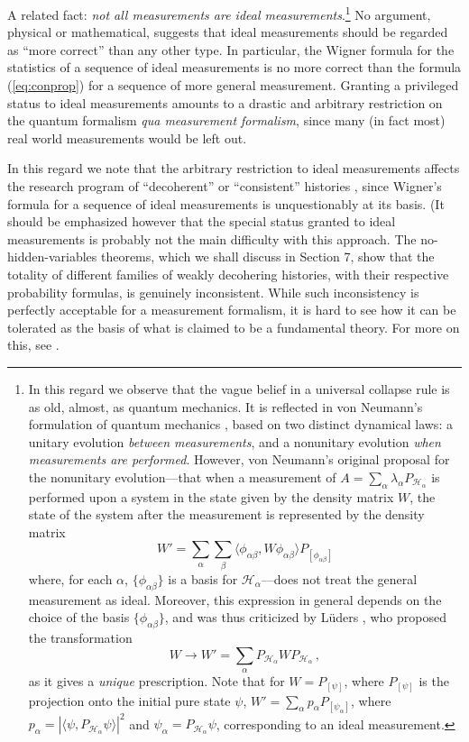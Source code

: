 \documentclass[12pt]{article}
\newcommand{\eq}[1]{(\ref{#1})}
\renewcommand{\a}{\alpha}
\newcommand{\la}{\lambda_{\a}}
\newcommand{\suma}{\sum_{\a }}
\newcommand{\psia}{\psi_{\a}}
\renewcommand{\H}{\mbox{$\mathcal{H}$}}
\newcommand{\Pa}{ P_{ {\mathcal{H}_{\a} } } }
\begin{document}
A related fact: \emph{not all measurements are ideal
   measurements}.\footnote{In this regard we observe that the vague
   belief in a universal collapse rule is as old, almost, as quantum
   mechanics.  It is reflected in von Neumann's formulation of quantum
   mechanics \cite{vNe55}, based on two distinct dynamical laws: a
   unitary evolution {\it between measurements\/}, and a nonunitary
   evolution {\it when measurements are performed}.  However, von
   Neumann's original proposal \cite{vNe55} for the nonunitary
   evolution---that when a measurement of $A=\sum_{\a}\la \Pa$ is
   performed upon a system in the state given by the density matrix
   $W$, the state of the system after the measurement is represented by
   the density matrix $$
   W' = \sum_{\a} \sum_{\beta}\langle \phi_{\a
     \beta}, W\phi_{\a \beta} \rangle P_{[\phi_{\a \beta}]}$$
   where,
   for each $\a$, $\{\phi_{\a \beta}\}$ is a basis for ${\H}_{\a}
   $---does not treat the general measurement as ideal.  Moreover, this
   expression in general depends on the choice of the basis $\{\phi_{\a
     \beta}\}$, and was thus criticized by L\"uders \cite{Lud51}, who
   proposed the transformation $$
   W \to W' = \suma \Pa W \Pa\,,$$
   as it
   gives a {\it unique} prescription.  Note that for $W=P_{[\psi]}$,
   where $P_{[\psi]}$ is the projection onto the initial pure state
   $\psi$, $ W'= \suma p_{\alpha} P_{[ \psia]}$, where $ p_\a =
   |\langle \psi,\Pa \psi\rangle|^2 $ and $\psia = \Pa\psi$,
   corresponding to an ideal measurement.} No argument, physical or
mathematical, suggests that ideal measurements should be regarded as
``more correct'' than any other type.  In particular, the Wigner
formula for the statistics of a sequence of ideal measurements is no
more correct than the formula \eq{eq:conprop} for a sequence of more
general measurement.  Granting a privileged status to ideal
measurements amounts to a drastic and arbitrary restriction on the
quantum formalism {\it qua measurement formalism}, since many (in fact
most) real world measurements would be left out.

In this regard we note that the arbitrary restriction to ideal
measurements affects the research program of ``decoherent'' or
``consistent'' histories \cite{GMH90,Omn88,Gri84}, since Wigner's
formula for a sequence of ideal measurements is unquestionably at its
basis.  (It should be emphasized however that the special status
granted to ideal measurements is probably not the main difficulty with
this approach.  The no-hidden-variables theorems, which we shall
discuss in Section 7, show that the totality of different families of
weakly decohering histories, with their respective probability
formulas, is genuinely inconsistent. While such inconsistency is
perfectly acceptable for a measurement formalism, it is hard to see
how it can be tolerated as the basis of what is claimed to be a
fundamental theory. For more on this, see \cite {DGZ92a, ShellyPT}.
\end{document}
